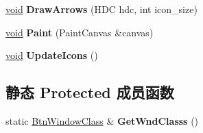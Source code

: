 \begin{DoxyCompactItemize}
\item 
\mbox{\label{struct_start_menu_a9b5e4b01944cb60db018e824f14268aa}} 
\hyperlink{interfacevoid}{void} {\bfseries Draw\+Arrows} (H\+DC hdc, int icon\+\_\+size)
\item 
\mbox{\label{struct_start_menu_a8a1ec82542267083ed0b40a76948d297}} 
\hyperlink{interfacevoid}{void} {\bfseries Paint} (Paint\+Canvas \&canvas)
\item 
\mbox{\label{struct_start_menu_aff7cbe92bfeb77744834c4e4db9252e2}} 
\hyperlink{interfacevoid}{void} {\bfseries Update\+Icons} ()
\end{DoxyCompactItemize}
\subsection*{静态 Protected 成员函数}
\begin{DoxyCompactItemize}
\item 
\mbox{\label{struct_start_menu_ae304d469738732ee35fdb147fb5fadce}} 
static \hyperlink{struct_btn_window_class}{Btn\+Window\+Class} \& {\bfseries Get\+Wnd\+Classs} ()
\end{DoxyCompactItemize}
